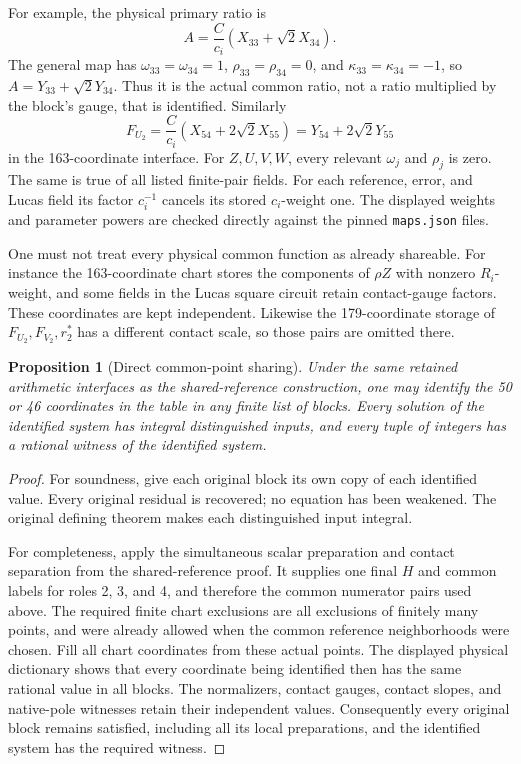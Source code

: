 \documentclass[11pt]{article}
\newtheorem{proposition}[theorem]{Proposition}
\begin{document}
For example, the physical primary ratio is
\[
 A=\frac C{c_i}(X_{33}+\sqrt2X_{34}).
\]
The general map has \(\omega_{33}=\omega_{34}=1\),
\(\rho_{33}=\rho_{34}=0\), and
\(\kappa_{33}=\kappa_{34}=-1\), so
\(A=Y_{33}+\sqrt2Y_{34}\).  Thus it is the actual common ratio,
not a ratio multiplied by the block's gauge, that is identified.
Similarly
\[
 F_{U_2}=\frac C{c_i}(X_{54}+2\sqrt2X_{55})
             =Y_{54}+2\sqrt2Y_{55}
\]
in the 163-coordinate interface.  For \(Z,U,V,W\), every relevant
\(\omega_j\) and \(\rho_j\) is zero.  The same is true of all listed
finite-pair fields.  For each reference, error, and Lucas field its
factor \(c_i^{-1}\) cancels its stored \(c_i\)-weight one.
The displayed weights and parameter powers are checked directly
against the pinned \texttt{maps.json} files.

One must not treat every physical common function as already shareable.
For instance the 163-coordinate chart stores the components of \(\rho Z\)
with nonzero \(R_i\)-weight, and some fields in the Lucas square circuit
retain contact-gauge factors.  These coordinates are kept independent.
Likewise the 179-coordinate storage of \(F_{U_2},F_{V_2},r_2^*\) has a
different contact scale, so those pairs are omitted there.

\begin{proposition}[Direct common-point sharing]\label{prop:common-direct}
Under the same retained arithmetic interfaces as the shared-reference
construction, one may identify the 50 or 46 coordinates in the table
in any finite list of blocks.  Every solution of the identified system
has integral distinguished inputs, and every tuple of integers has a
rational witness of the identified system.
\end{proposition}
\begin{proof}
For soundness, give each original block its own copy of each identified
value.  Every original residual is recovered; no equation has been
weakened.  The original defining theorem makes each distinguished
input integral.

For completeness, apply the simultaneous scalar preparation and contact
separation from the shared-reference proof.  It supplies one final \(H\)
and common labels for roles 2, 3, and 4, and therefore the common numerator
pairs used above.  The required finite chart exclusions are all exclusions
of finitely many points, and were already allowed when the common
reference neighborhoods were chosen.  Fill all chart coordinates from
these actual points.  The displayed physical dictionary shows that every
coordinate being identified then has the same rational value in all
blocks.  The normalizers, contact gauges, contact slopes, and native-pole
witnesses retain their independent values.  Consequently every original
block remains satisfied, including all its local preparations, and the
identified system has the required witness.
\end{proof}
\end{document}
